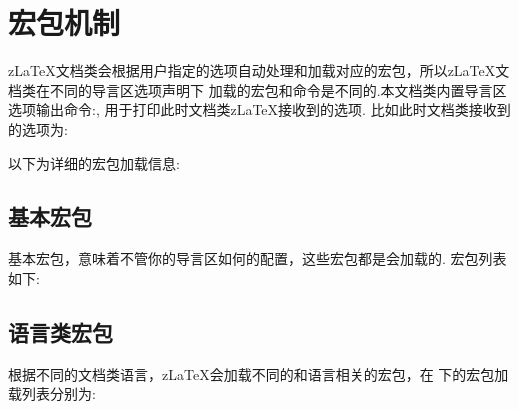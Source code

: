 \clearpage
\section{宏包机制}
z\LaTeX{}文档类会根据用户指定的选项自动处理和加载对应的宏包，所以z\LaTeX{}文档类在不同的导言区选项声明下
加载的宏包和命令是不同的.本文档类内置导言区选项输出命令:\cmd{\zlatexOptions}\index{\cmd{\zlatexOptions}},
用于打印此时文档类z\LaTeX{}接收到的选项. 比如此时文档类接收到的选项为: 
\begin{center}
    \zlatexOptions
\end{center}

以下为详细的宏包加载信息:

\subsection{基本宏包}
基本宏包，意味着不管你的导言区如何的配置，这些宏包都是会加载的. 宏包列表如下:

\begin{table}[H]
    \caption{z\LaTeX{}文档类基本宏包}
    \label{tab:basic-package}
\end{table}

\subsection{语言类宏包}
根据不同的文档类语言，z\LaTeX{}会加载不同的和语言相关的宏包，在
下的宏包加载列表分别为:

\begin{table}[H]
    \caption{z\LaTeX{}文档类语言宏包}
    \label{tab:lang-package}
\end{table}

